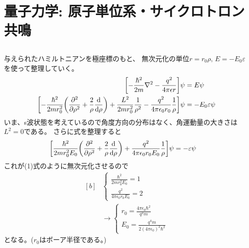 \documentclass[../../master.tex]{subfiles}
\begin{document}
\section{量子力学: 原子単位系・サイクロトロン共鳴}
\subsection{}
与えられたハミルトニアンを極座標のもと、
無次元化の単位\(r=r_0 \rho,\,E=-E_0 \varepsilon\)を使って整理していく。
\begin{equation}\begin{aligned}[b]
    \qty[-\frac{\hbar^2}{2m}\laplacian - \frac{q^2}{4\pi\epsilon r}]\psi &= E\psi\\
    \qty[-\frac{\hbar^2}{2mr_0^2}\qty(\pdv[2]{\rho}
    + \frac{2}{\rho}\dv{\rho})+\frac{L^2}{2mr_0^2}\frac{1}{\rho^2}-\frac{q^2}{4\pi\epsilon_0 r_0}\frac{1}{\rho}]\psi
    &= -E_0 \varepsilon\psi
\end{aligned}\end{equation}
いま、s波状態を考えているので角度方向の分布はなく、角運動量の大きさは\(L^2=0\)である。
さらに式を整理すると
\begin{equation}\begin{aligned}[b]
    \qty[\frac{\hbar^2}{2mr_0^2E_0}\qty(\pdv[2]{\rho}
    + \frac{2}{\rho}\dv{\rho})+\frac{q^2}{4\pi\epsilon_0 r_0 E_0}\frac{1}{\rho}]\psi
    &= -\varepsilon\psi
\end{aligned}\end{equation}
これが(1)式のように無次元化させるので
\begin{equation}\begin{aligned}[b]
    &\begin{cases}
        \frac{\hbar^2}{2mr_0^2 E_0} = 1\\
        \frac{q^2}{4\pi\epsilon_0r_0 E_0} = 2
    \end{cases}\\
    &\rightarrow\begin{cases}
        r_0 = \frac{4\pi\epsilon_0\hbar^2}{q^2m}    \\
        E_0 = \frac{q^4m}{2(4\pi\epsilon_0)^2\hbar^2}
    \end{cases}
\end{aligned}\end{equation}
となる。(\(r_0\)はボーア半径である。)
\end{document}
